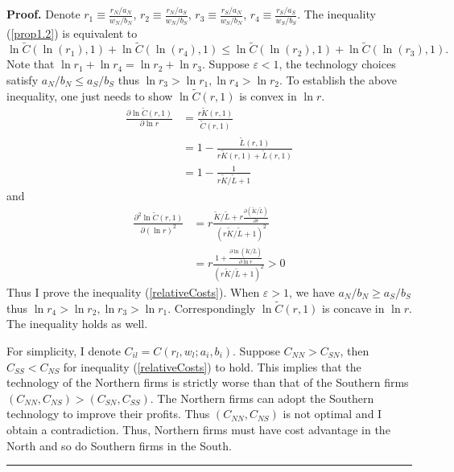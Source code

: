 \documentclass[notitlepage,11pt]{article}%
\newenvironment{proof}[1][Proof]{\noindent \textbf{#1.} }{\  \rule{0.5em}{0.5em}}
\begin{document}
\begin{proof}
Denote $r_{1}\equiv\frac{r_{N}/a_{N}}{w_{N}/b_{N}}$, $r_{2}\equiv\frac
{r_{N}/a_{S}}{w_{N}/b_{S}}$, $r_{3}\equiv\frac{r_{S}/a_{N}}{w_{S}/b_{N}}$,
$r_{4}\equiv\frac{r_{S}/a_{S}}{w_{S}/b_{S}}$. The inequality (\ref{prop1.2})
is equivalent to
\[
\ln\tilde{C}\left(  \ln\left(  r_{1}\right)  ,1\right)  +\ln\tilde{C}\left(
\ln\left(  r_{4}\right)  ,1\right)  \leq\ln\tilde{C}\left(  \ln\left(
r_{2}\right)  ,1\right)  +\ln\tilde{C}\left(  \ln\left(  r_{3}\right)
,1\right)  .
\]
Note that $\ln r_{1}+\ln r_{4}=\ln r_{2}+\ln r_{3}$. Suppose $\varepsilon<1$,
the technology choices satisfy $a_{N}/b_{N}\leq a_{S}/b_{S}$ thus $\ln
r_{3}>\ln r_{1},\ln r_{4}>\ln r_{2}$. To establish the above inequality, one
just needs to show $\ln\tilde{C}\left(  r,1\right)  $ is convex in $\ln r$.%
\begin{align*}
\frac{\partial\ln\tilde{C}\left(  r,1\right)  }{\partial\ln r}  &
=\frac{r\tilde{K}\left(  r,1\right)  }{\tilde{C}\left(  r,1\right)  }\\
&  =1-\frac{\tilde{L}\left(  r,1\right)  }{r\tilde{K}\left(  r,1\right)
+\tilde{L}\left(  r,1\right)  }\\
&  =1-\frac{1}{r\tilde{K}/\tilde{L}+1}%
\end{align*}
and%
\begin{align*}
\frac{\partial^{2}\ln\tilde{C}\left(  r,1\right)  }{\partial\left(  \ln
r\right)  ^{2}}  &  =r\frac{\tilde{K}/\tilde{L}+r\frac{\partial\left(
\tilde{K}/\tilde{L}\right)  }{\partial r}}{\left(  r\tilde{K}/\tilde
{L}+1\right)  ^{2}}\\
&  =r\frac{1+\frac{\partial\ln\left(  \tilde{K}/\tilde{L}\right)  }%
{\partial\ln r}}{\left(  r\tilde{K}/\tilde{L}+1\right)  ^{2}}>0
\end{align*}
Thus I prove the inequality (\ref{relativeCosts}). When $\varepsilon>1$, we
have $a_{N}/b_{N}\geq a_{S}/b_{S}$ thus $\ln r_{4}>\ln r_{2},\ln r_{3}>\ln
r_{1}$. Correspondingly $\ln\tilde{C}\left(  r,1\right)  $ is concave in $\ln
r$. The inequality holds as well.

For simplicity, I denote $C_{il}=C\left(  r_{l},w_{l};a_{i},b_{i}\right)  $.
Suppose $C_{NN}>C_{SN}$, then $C_{SS}<C_{NS}$ for inequality
(\ref{relativeCosts}) to hold. This implies that the technology of the
Northern firms is strictly worse than that of the Southern firms $\left(
C_{NN},C_{NS}\right)  >\left(  C_{SN},C_{SS}\right)  $. The Northern firms can
adopt the Southern technology to improve their profits. Thus $\left(
C_{NN},C_{NS}\right)  $ is not optimal and I obtain a contradiction. Thus,
Northern firms must have cost advantage in the North and so do Southern firms
in the South.
\end{proof}
\end{document}
